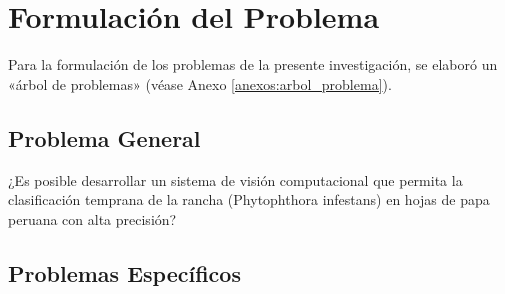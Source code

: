 

\section{Formulación del Problema}
Para la formulación de los problemas de la presente investigación, se elaboró un «árbol de problemas» (véase Anexo \ref{anexos:arbol_problema}).
\subsection{Problema General}
\newcommand{\ProblemaGeneral}{
	¿Es posible desarrollar un sistema de visión computacional que permita la clasificación temprana de la rancha (Phytophthora infestans) en hojas de papa peruana con alta precisión?
}

\ProblemaGeneral
\subsection{Problemas Espec\'{i}ficos}
\newcommand{\Pbone}{
	¿Cómo podemos desarrollar un sistema de detección automática de "Rancha" Phytophthora infestans en las hojas de papa peruana que sea preciso, eficiente y robusto a la variabilidad de las lesiones y las condiciones ambientales?
	
}

\newcommand{\Pbtwo}{
	¿Cómo obtener un conjunto de datos representativo y diverso de imágenes de hojas de papa con Rancha y sin ella?
}

\newcommand{\Pbthree}{
¿Cuáles son las técnicas de visión computacional más apropiadas para la detección temprana de "Rancha" en hojas de papa peruano?
}

\newcommand{\Pbfour}{
¿Cuáles son las técnicas de preprocesamiento de imágenes más apropiadas para la detección temprana de "Rancha" en hojas de papa peruano??
}

